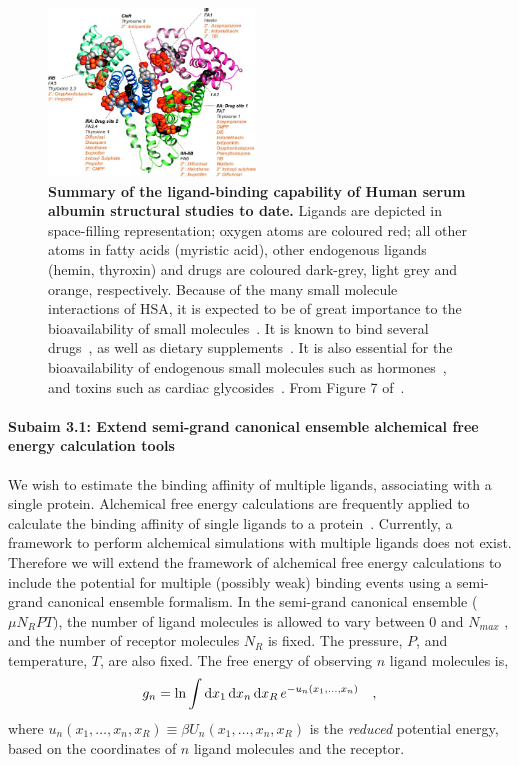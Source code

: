 \documentclass[10pt,final]{article}
\newcommand{\subsubsubsection}[1]{\paragraph*{#1}}
\begin{document}
\begin{figure}[H]
	\centering	
	\includegraphics[width=0.49\textwidth]{figures/hsa_fig7_ghuman2005.jpg}
	\caption{\textbf{Summary of the ligand-binding capability of Human serum albumin structural studies to date.} Ligands are depicted in space-filling representation; oxygen atoms are coloured red; all other atoms in fatty acids (myristic acid), other endogenous ligands (hemin, thyroxin) and drugs are coloured dark-grey, light grey and orange, respectively. Because of the many small molecule interactions of HSA, it is expected to be of great importance to the bioavailability of small molecules~\cite{Metcalfe2010a}. It is known to bind several drugs~\cite{SJOeHOLM1979a,Bannwarth1996a,Sulkowska2002a,Ghuman2005a,Perez2007a}, as well as dietary supplements~\cite{Pal2013a}. It is also essential for the bioavailability of endogenous small molecules such as hormones~\cite{Pardridge1986a}, and toxins such as cardiac glycosides~\cite{Smith1985a}. From Figure 7 of~\cite{Ghuman2005a}.
}
	\label{figure:albumin}
\end{figure} 



\subsubsubsection{Subaim 3.1: Extend semi-grand canonical ensemble alchemical free energy calculation tools}
We wish to estimate the binding affinity of multiple ligands, associating with a single protein.
%
Alchemical free energy calculations are frequently applied to calculate the binding affinity of single ligands to a protein~\cite{Shirts2007a}. 
%
Currently, a framework to perform alchemical simulations with multiple ligands does not exist.
%
Therefore we will extend the framework of alchemical free energy calculations to include the potential for multiple (possibly weak) binding events using a semi-grand canonical ensemble formalism. 
%
In the semi-grand canonical ensemble ($\mu N_R PT)$, the number of ligand molecules is allowed to vary between 0 and $N_{max}$ , and the number of receptor molecules $N_R$ is fixed.
%
The pressure, $P$, and temperature, $T$, are also fixed. The free energy of observing $n$ ligand molecules is,
\begin{align}
 g_n = \ln \int \dif x_1 \dif x_n \dif x_R \, e^{-u_n(x_1,\dots,x_n)} \quad,
\end{align}
where  $u_n(x_1,\ldots,x_n,x_R) \equiv \beta U_n(x_1,\ldots,x_n,x_R)$ is the \emph{reduced} potential energy, based on the coordinates of $n$ ligand molecules and the receptor.
\end{document}
